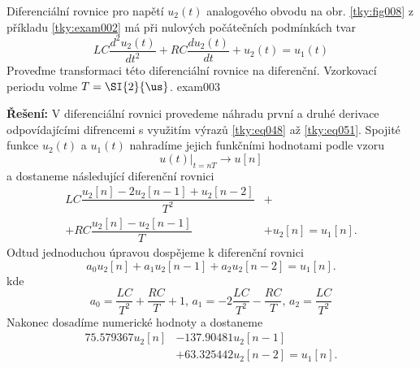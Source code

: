 \begin{tkyexam}{Diferenciální rovnice pro napětí \(u_2(t)\) analogového obvodu na obr.
  \ref{tky:fig008} z příkladu \ref{tky:exam002} má při nulových počátečních podmínkách tvar
  \begin{equation*}
    LC\frac{d^2u_2(t)}{dt^2}+RC\frac{du_2(t)}{dt}+u_2(t)=u_1(t)
  \end{equation*}
  Proveďme transformaci této diferenciální rovnice na diferenční. Vzorkovací periodu volme \(T =
  \protect\SI{2}{\protect\us}\). }{exam003}

  \noindent\textbf{Řešení:}
  V diferenciální rovnici provedeme náhradu první a druhé derivace odpovídajícími difrencemi s
  využitím výrazů \ref{tky:eq048} až \ref{tky:eq051}. Spojité funkce \(u_2(t)\) a \(u_1(t)\)
  nahradíme jejich funkčními hodnotami podle vzoru
  \begin{equation*}
    \left.u(t)\right\rvert_{t=nT}  \rightarrow u[n]
  \end{equation*}
  a dostaneme následující diferenční rovnici
  \begin{align*}
      LC\dfrac{u_2[n] - 2u_2[n-1]    + u_2[n-2]}{T^2} &+      \\
    + RC\dfrac{u_2[n] - u_2[n-1]}{T}                  &+ u_2[n]=u_1[n]. 
  \end{align*}
  Odtud jednoduchou úpravou dospějeme k diferenční rovnici
  \begin{equation*}
    a_0u_2[n] + a_1u_2[n-1] + a_2u_2[n-2]=u_1[n].
  \end{equation*}
  kde
  \begin{equation*}
    a_0 = \frac{LC}{T^2} + \frac{RC}{T} + 1, \, a_1 = -2\frac{LC}{T^2} - \frac{RC}{T}, \,  
    a_2 = \frac{LC}{T^2}
  \end{equation*}
  Nakonec dosadíme numerické hodnoty a dostaneme
  \begin{align}
    \num{75.579367}u_2[n] &- \num{137.90481}u_2[n-1]                       \nonumber \\
                          &+ \num{63.325442}u_2[n-2] = u_1[n].             \label{tky:eq061}
  \end{align}
\end{tkyexam}